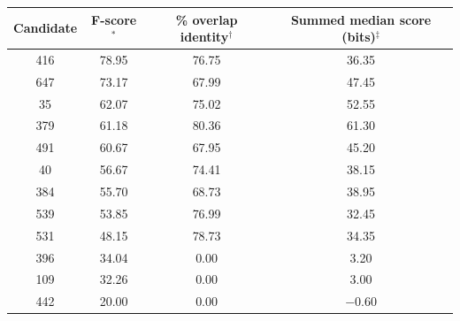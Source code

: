 \begin{tabular}{cccc}
\hline
\textbf{Candidate} & \textbf{F-score$^{*}$} & \textbf{\% overlap identity$^{\dagger}$} & \textbf{Summed median score (bits)$^{\ddagger}$} \\
\hline
416 & 78.95 & 76.75 & 36.35 \\
647 & 73.17 & 67.99 & 47.45 \\
35  & 62.07 & 75.02 & 52.55 \\
379 & 61.18 & 80.36 & 61.30 \\
491 & 60.67 & 67.95 & 45.20 \\
40  & 56.67 & 74.41 & 38.15 \\
384 & 55.70 & 68.73 & 38.95 \\
539 & 53.85 & 76.99 & 32.45 \\
531 & 48.15 & 78.73 & 34.35 \\
396 & 34.04 & 0.00  & 3.20 \\
109 & 32.26 & 0.00  & 3.00 \\
442 & 20.00 & 0.00  & $-0.60$ \\
\hline
\end{tabular}